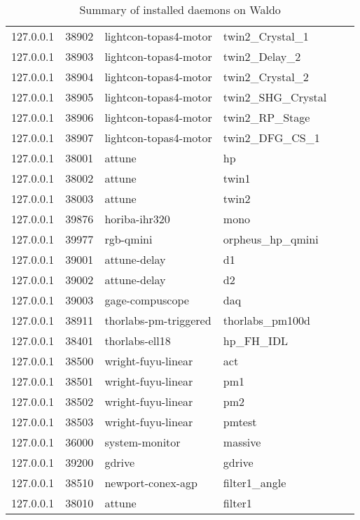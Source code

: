 \begin{table}[]
\begin{tabular}{llllll}
127.0.0.1 & 38902 & lightcon-topas4-motor   & twin2\_Crystal\_1  \\
127.0.0.1 & 38903 & lightcon-topas4-motor   & twin2\_Delay\_2    \\
127.0.0.1 & 38904 & lightcon-topas4-motor   & twin2\_Crystal\_2  \\
127.0.0.1 & 38905 & lightcon-topas4-motor   & twin2\_SHG\_Crystal \\
127.0.0.1 & 38906 & lightcon-topas4-motor   & twin2\_RP\_Stage   \\
127.0.0.1 & 38907 & lightcon-topas4-motor   & twin2\_DFG\_CS\_1  \\
127.0.0.1 & 38001 & attune                  & hp                 \\
127.0.0.1 & 38002 & attune                  & twin1              \\
127.0.0.1 & 38003 & attune                  & twin2              \\
127.0.0.1 & 39876 & horiba-ihr320           & mono               \\
127.0.0.1 & 39977 & rgb-qmini               & orpheus\_hp\_qmini \\
127.0.0.1 & 39001 & attune-delay            & d1                 \\
127.0.0.1 & 39002 & attune-delay            & d2                 \\
127.0.0.1 & 39003 & gage-compuscope         & daq                \\
127.0.0.1 & 38911 & thorlabs-pm-triggered   & thorlabs\_pm100d   \\
127.0.0.1 & 38401 & thorlabs-ell18          & hp\_FH\_IDL        \\
127.0.0.1 & 38500 & wright-fuyu-linear      & act                \\
127.0.0.1 & 38501 & wright-fuyu-linear      & pm1                \\
127.0.0.1 & 38502 & wright-fuyu-linear      & pm2                \\
127.0.0.1 & 38503 & wright-fuyu-linear      & pmtest             \\
127.0.0.1 & 36000 & system-monitor          & massive            \\
127.0.0.1 & 39200 & gdrive                  & gdrive             \\
127.0.0.1 & 38510 & newport-conex-agp       & filter1\_angle     \\
127.0.0.1 & 38010 & attune                  & filter1            \\ \hline
\end{tabular}
\caption[Waldo Daemons]{Summary of installed daemons on Waldo}
\label{waldo:tab:summary}
\end{table}


\clearpage

